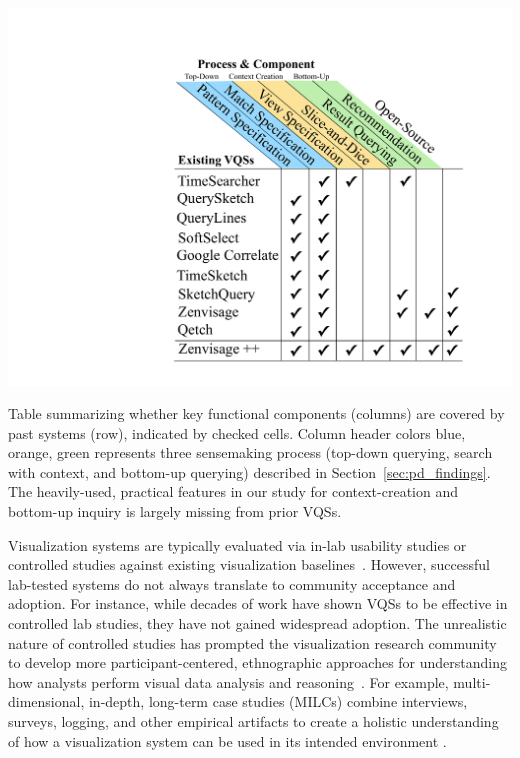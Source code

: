 {  \begin{table}[ht!]
    \vspace*{-10pt}
     \centering
     \includegraphics[width=0.8\linewidth]{figures/related_works_table.pdf}
     \caption{Table summarizing whether key functional components (columns) are covered by past systems (row), indicated by checked cells. Column header colors blue, orange, green represents three sensemaking process (top-down querying, search with context, and bottom-up querying) described in Section~\ref{sec:pd_findings}. The heavily-used, practical features in our study for context-creation and bottom-up inquiry is largely missing from prior VQSs.}
     \label{table:relatedwork}
     \vspace*{-10pt}
  \end{table}
  \par {}
  \npar Visualization systems are typically evaluated via in-lab usability studies or controlled studies against existing visualization baselines~\cite{Plaisant2004,North2006,Yi2008}. However, successful lab-tested systems do not always translate to community acceptance and adoption. For instance, while decades of work have shown VQSs to be effective in controlled lab studies, they have not gained widespread adoption. The unrealistic nature of controlled studies has prompted the visualization research community to develop more participant-centered, ethnographic approaches for understanding how analysts perform visual data analysis and reasoning~\cite{Plaisant2004,lam2012empirical,shneiderman2006strategies,munzner2009nested,Sedlmair2012}. For example, multi-dimensional, in-depth, long-term case studies (MILCs) combine interviews, surveys, logging, and other empirical artifacts to create a holistic understanding of how a visualization system can be used in its intended environment \cite{shneiderman2006strategies}. 
}
